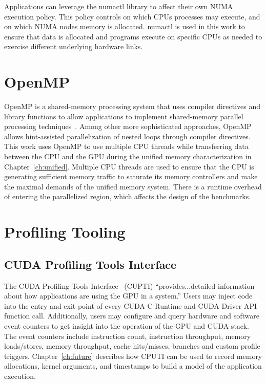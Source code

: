 Applications can leverage the numactl\cite{wickman2015numactl} library to affect their own NUMA execution policy.
This policy controls on which CPUs processes may execute, and on which NUMA nodes memory is allocated.
numactl is used in this work to ensure that data is allocated and programs execute on specific CPUs as needed to exercise different underlying hardware links.

\section{OpenMP}
\label{sec:openmp}

OpenMP is a shared-memory processing system that uses compiler directives and library functions to allow applications to implement shared-memory parallel processing techniques~\cite{openmp2013}.
Among other more sophisticated approaches, OpenMP allows hint-assisted parallelization of nested loops through compiler directives.
This work uses OpenMP to use multiple CPU threads while transferring data between the CPU and the GPU during the unified memory characterization in Chapter~\ref{ch:unified}. 
Multiple CPU threads are used to ensure that the CPU is generating sufficient memory traffic to saturate its memory controllers and make the maximal demands of the unified memory system.
There is a runtime overhead of entering the parallelized region, which affects the design of the benchmarks.

\section{Profiling Tooling}
\label{sec:profiling}

\subsection{CUDA Profiling Tools Interface}
\label{sec:cupti}

The CUDA Profiling Tools Interface~\cite{nvidia2017cupti} (CUPTI) ``provides...detailed information about how applications are using the GPU in a system.''
Users may inject code into the entry and exit point of every CUDA C Runtime and CUDA Driver API function call.
Additionally, users may configure and query hardware and software event counters to get insight into the operation of the GPU and CUDA stack.
The event counters include instruction count, instruction throughput, memory loads/stores, memory throughput, cache hits/misses, branches and custom profile triggers.
Chapter~\ref{ch:future} describes how CPUTI can be used to record memory allocations, kernel arguments, and timestamps to build a model of the application execution.


